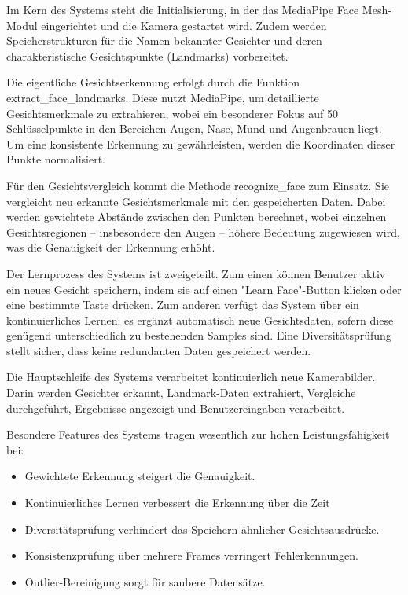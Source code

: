 Im Kern des Systems steht die Initialisierung, in der das MediaPipe Face Mesh-Modul eingerichtet und die Kamera gestartet wird.
Zudem werden Speicherstrukturen für die Namen bekannter Gesichter und deren charakteristische Gesichtspunkte (Landmarks) vorbereitet.

Die eigentliche Gesichtserkennung erfolgt durch die Funktion extract\_face\_landmarks. Diese nutzt MediaPipe, um detaillierte Gesichtsmerkmale zu extrahieren, wobei ein besonderer Fokus auf 50 Schlüsselpunkte in den Bereichen Augen, Nase, Mund und Augenbrauen liegt.
Um eine konsistente Erkennung zu gewährleisten, werden die Koordinaten dieser Punkte normalisiert.

Für den Gesichtsvergleich kommt die Methode recognize\_face zum Einsatz. Sie vergleicht neu erkannte Gesichtsmerkmale mit den gespeicherten Daten.
Dabei werden gewichtete Abstände zwischen den Punkten berechnet, wobei einzelnen Gesichtsregionen – insbesondere den Augen – höhere Bedeutung zugewiesen wird, was die Genauigkeit der Erkennung erhöht.

Der Lernprozess des Systems ist zweigeteilt. Zum einen können Benutzer aktiv ein neues Gesicht speichern, indem sie auf einen "Learn Face"-Button klicken oder eine bestimmte Taste drücken.
Zum anderen verfügt das System über ein kontinuierliches Lernen: es ergänzt automatisch neue Gesichtsdaten, sofern diese genügend unterschiedlich zu bestehenden Samples sind.
Eine Diversitätsprüfung stellt sicher, dass keine redundanten Daten gespeichert werden.

Die Hauptschleife des Systems verarbeitet kontinuierlich neue Kamerabilder. Darin werden Gesichter erkannt, Landmark-Daten extrahiert, Vergleiche durchgeführt, Ergebnisse angezeigt und Benutzereingaben verarbeitet.

Besondere Features des Systems tragen wesentlich zur hohen Leistungsfähigkeit bei:
\begin{itemize}
    \item Gewichtete Erkennung steigert die Genauigkeit.
    \item Kontinuierliches Lernen verbessert die Erkennung über die Zeit
    \item Diversitätsprüfung verhindert das Speichern ähnlicher Gesichtsausdrücke.
    \item Konsistenzprüfung über mehrere Frames verringert Fehlerkennungen.
    \item Outlier-Bereinigung sorgt für saubere Datensätze.
\end{itemize}

